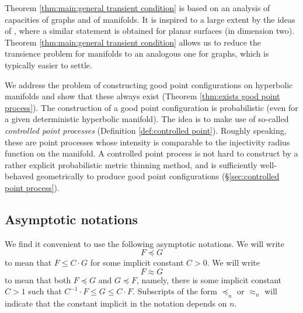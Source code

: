 \documentclass{amsart}
\newcommand{\ZZ}{\mathbb{Z}}
\theoremstyle{plain}
\newtheorem{cor}[theorem]{Corollary}
\numberwithin{equation}{section}
\theoremstyle{definition}
\begin{document}

Theorem \ref{thm:main:general transient condition} is based on an analysis of capacities of graphs and of manifolds. It is inspired to a large extent by the ideas of \cite{gurel2017recurrence}, where a similar statement is obtained for planar surfaces (in dimension two). Theorem \ref{thm:main:general transient condition} allows us to reduce the transience problem for manifolds to an analogous one for graphs, which is typically easier to settle.

We address the problem of constructing good point configurations on hyperbolic manifolds and show that these always exist (Theorem \ref{thm:exists good point process}). The construction of a good point configuration is probabilistic (even for a given deterministic hyperbolic manifold). The idea is to make use of so-called \emph{controlled point processes} (Definition \ref{def:controlled point}). Roughly speaking, these are point processes whose intensity is comparable to the injectivity radius function on the manifold. A controlled point process is not hard to construct by a rather explicit probabilistic metric thinning method, and is sufficiently well-behaved geometrically to produce good point configurations (\S\ref{sec:controlled point process}).







\subsection{Asymptotic notations} We find it convenient to use the following asymptotic notations. We will write
$$ F \preceq G $$
to mean that $F \le C\cdot G$ for some implicit constant $C > 0$. We will write 
$$ F \approx G $$
to mean that both $F \preceq G $ and $G \preceq F $, namely, there is some implicit constant $C > 1$ such that $C^{-1} \cdot F \le G \le C \cdot F$.
Subscripts of the form $\preceq_n$ or $\approx_n$ will indicate that the constant implicit in the notation depends on $n$.
\end{document}
